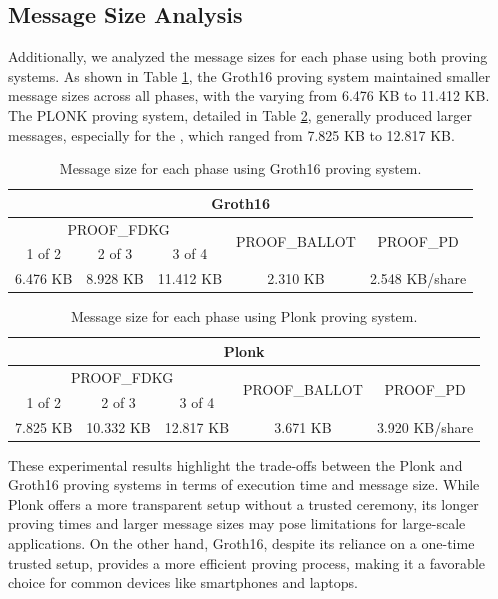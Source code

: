 \documentclass[runningheads]{llncs}
\begin{document}
\subsection{Message Size Analysis}

Additionally, we analyzed the message sizes for each phase using both proving systems. As shown in Table \ref{table:groth16-size}, the Groth16 proving system maintained smaller message sizes across all phases, with the  varying from 6.476 KB to 11.412 KB. The PLONK proving system, detailed in Table \ref{table:plonk-size}, generally produced larger messages, especially for the , which ranged from 7.825 KB to 12.817 KB.


\begin{table}
\centering
\label{table:groth16-size}
\caption{Message size for each phase using Groth16 proving system.}
\begin{tabular}{|c|c|c|c|c|}
    \hline
    \multicolumn{5}{|c|}{Groth16} \\
    \hline
    \multicolumn{3}{|c|}{\textrm{PROOF}_\textrm{FDKG}} & \multirow{2}{*}{\textrm{PROOF}_\textrm{BALLOT}} & \multirow{2}{*}{\textrm{PROOF}_\textrm{PD}} \\
    \cline{1-3}
    1 of 2 & 2 of 3 & 3 of 4 & & \\
    \hline
    6.476 KB& 8.928 KB & 11.412 KB & 2.310 KB & 2.548 KB/share\\
    \hline
\end{tabular}
\end{table}


\begin{table}
\centering
\label{table:plonk-size}
\caption{Message size for each phase using Plonk proving system.}
\begin{tabular}{|c|c|c|c|c|}
    \hline
    \multicolumn{5}{|c|}{Plonk} \\
    \hline
    \multicolumn{3}{|c|}{\textrm{PROOF}_\textrm{FDKG}} & \multirow{2}{*}{\textrm{PROOF}_\textrm{BALLOT}} & \multirow{2}{*}{\textrm{PROOF}_\textrm{PD}} \\
    \cline{1-3}
    1 of 2 & 2 of 3 & 3 of 4 & & \\
    \hline
    7.825 KB& 10.332 KB & 12.817 KB & 3.671 KB & 3.920 KB/share\\
    \hline
\end{tabular}
\end{table}

These experimental results highlight the trade-offs between the Plonk and Groth16 proving systems in terms of execution time and message size. While Plonk offers a more transparent setup without a trusted ceremony, its longer proving times and larger message sizes may pose limitations for large-scale applications. On the other hand, Groth16, despite its reliance on a one-time trusted setup, provides a more efficient proving process, making it a favorable choice for common devices like smartphones and laptops.
\end{document}
